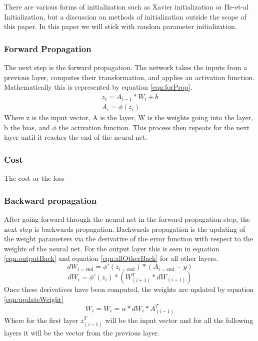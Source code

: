 \documentclass[12pt]{article}
\begin{document}
	There are various forms of initialization such as Xavier initialization or He-et-al Initialization, but a discussion on methods of initialization outside the scope of this paper. In this paper we will stick with random parameter initialization. 
	
	

	\subsubsection{Forward Propagation}
	The next step is the forward propagation. The network takes the inputs from a previous layer, computes their transformation, and applies an activation function. Mathematically this is represented by equation \ref{eqn:forProp}. 
	\begin{equation}
	\begin{aligned}
	z_i = A_{i-1}* W_{i}+b\\
	A_i=\phi(z_i)
	\end{aligned}
	\label{eqn:forProp}
	\end{equation}
	Where z is the input vector, A is the layer, W is the weights going into the layer, b the bias, and $\phi$ the activation function. This process then repeats for the next layer until it reaches the end of the neural net.
	
	\subsubsection{Cost}
	The cost or the loss

	\subsubsection{Backward propagation}
	
	After going forward through the neural net in the forward propagation step, the next step is backwards propagation. Backwards propagation is the updating of the weight parameters via the derivative of the error function with respect to the weights of the neural net. For the output layer this is seen in equation \ref{eqn:outputBack} and equation \ref{eqn:allOtherBack} for all other layers.
	\begin{equation}
	dW_{i=\text{end}}=\phi'(z_{i=\text{end}})*\left(A_{i=\text{end}}-y\right)
	\label{eqn:outputBack}
	\end{equation}
	\begin{equation}
	dW_i=\phi'(z_i)*\left(W_{\left(i+1\right)}^T*dW_{\left(i+1\right)}\right)
	\label{eqn:allOtherBack}
	\end{equation}
	Once these derivatives have been computed, the weights are updated by equation \ref{eqn:updateWeight}
	\begin{equation}
	W_i = W_i=\alpha*dW_{i}*A_{\left(i-1\right)}^T
	\label{eqn:updateWeight}
	\end{equation}
	Where for the first layer $z_{\left(i-1\right)}^T$ will be the input vector and for all the following layers it will be the vector from the previous layer. 
\end{document}
